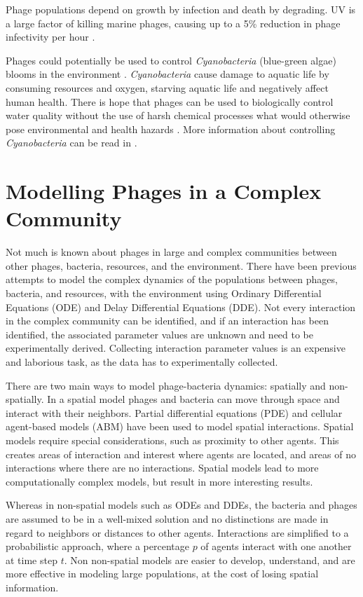 Phage populations depend on growth by infection and death by degrading. 
UV is a large factor of killing marine phages, causing up to a 5\% reduction in phage infectivity per hour \cite{chibani-chennoufiPhageHostInteractionEcological2004}. 

Phages could potentially be used to control \textit{Cyanobacteria} (blue-green algae) blooms in the environment \cite{colomaFrequencyVirusresistantHosts2019}. 
\textit{Cyanobacteria} cause damage to aquatic life by consuming resources and oxygen, starving aquatic life and negatively affect human health. 
There is hope that phages can be used to biologically control water quality without the use of harsh chemical processes what would otherwise pose environmental and health hazards \cite{tuckerIdentificationCyanophageMaLBP2005}. 
More information about controlling \textit{Cyanobacteria} can be read in . 

\section{Modelling Phages in a Complex Community}
Not much is known about phages in large and complex communities between other phages, bacteria, resources, and the environment. 
There have been previous attempts to model the complex dynamics of the populations between phages, bacteria, and resources, with the environment using Ordinary Differential Equations (ODE) and Delay Differential Equations (DDE).
Not every interaction in the complex community can be identified, and if an interaction has been identified, the associated parameter values are unknown and need to be experimentally derived. 
Collecting interaction parameter values is an expensive and laborious task, as the data has to experimentally collected. 

There are two main ways to model phage-bacteria dynamics: spatially and non-spatially.
In a spatial model phages and bacteria can move through space and interact with their neighbors. 
Partial differential equations (PDE) and cellular agent-based models (ABM) have been used to model spatial interactions.
Spatial models require special considerations, such as proximity to other agents.
This creates areas of interaction and interest where agents are located, and areas of no interactions where there are no interactions.
Spatial models lead to more computationally complex models, but result in more interesting results. 

Whereas in non-spatial models such as ODEs and DDEs, the bacteria and phages are assumed to be in a well-mixed solution and no distinctions are made in regard to neighbors or distances to other agents. 
Interactions are simplified to a probabilistic approach, where a percentage $p$ of agents interact with one another at time step $t$.
Non non-spatial models are easier to develop, understand, and are more effective in modeling large populations, at the cost of losing spatial information. 

